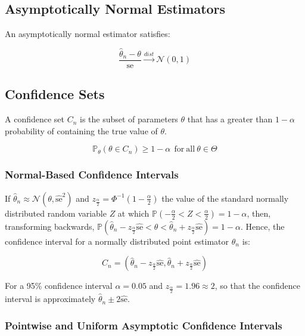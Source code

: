 \subsection{Asymptotically Normal Estimators}
An asymptotically normal estimator satisfies:

\begin{equation}
\frac{\hat{\theta}_n - \theta}{\mathrm{se}} \xrightarrow{dist} \mathscr{N}(0,1)
\end{equation}


\subsection{Confidence Sets}

A confidence set $C_n$ is the subset of parameters $\theta$ that has a greater than $1-\alpha$ probability of containing the true value of $\theta$.

\begin{equation}
\mathbb{P}_{\theta}(\theta \in C_n)\geq 1-\alpha\ \mathrm{\ for\ all\ }\theta\in\Theta
\end{equation}

\subsubsection{Normal-Based Confidence Intervals}

If $\hat{\theta}_n \approx \mathscr{N}(\theta,\hat{\mathrm{se}}^2)$ and $z_{\frac{\alpha}{2}} = \Phi^{-1}(1-\frac{\alpha}{2})$ the value of the standard normally distributed random variable $Z$ at which $\mathbb{P}(-\frac{\alpha}{2} < Z < \frac{\alpha}{2}) = 1-\alpha$, then, transforming backwards, $\mathbb{P}(\hat{\theta}_n - z_{\frac{\alpha}{2}}\hat{\mathrm{se}} < \theta < \hat{\theta}_n + z_{\frac{\alpha}{2}}\hat{\mathrm{se}} ) = 1-\alpha$. Hence, the confidence interval for a normally distributed point estimator $\hat{\theta}_n$ is: 

\begin{equation}
C_n = (\hat{\theta}_n - z_{\frac{\alpha}{2}}\hat{\mathrm{se}},\hat{\theta}_n + z_{\frac{\alpha}{2}}\hat{\mathrm{se}})
\end{equation}

For a 95\% confidence interval $\alpha=0.05$ and $z_{\frac{\alpha}{2}} = 1.96 \approx 2$, so that the confidence interval is approximately $\hat{\theta}_n \pm 2 \hat{\mathrm{se}}$. 


\subsubsection{Pointwise and Uniform Asymptotic Confidence Intervals}

